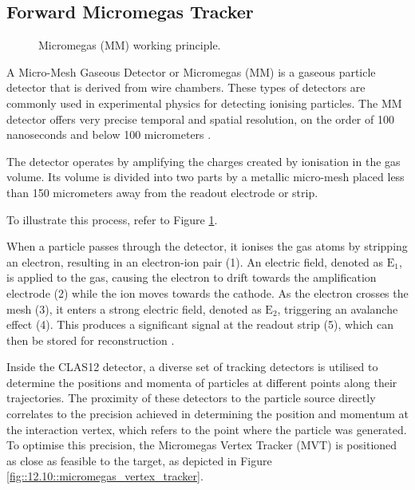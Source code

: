\subsection{Forward Micromegas Tracker}
\label{12.10::forward_micromegas_tracker}
    \begin{figure}[b!]
        \caption[Micromegas (MM) working principle]
        {Micromegas (MM) working principle.}
        \label{fig::12.10::micromegas_principle}
    \end{figure}

    A Micro-Mesh Gaseous Detector or Micromegas (MM) is a gaseous particle detector that is derived from wire chambers.
    These types of detectors are commonly used in experimental physics for detecting ionising particles.
    The MM detector offers very precise temporal and spatial resolution, on the order of 100 nanoseconds and below 100 micrometers \cite{giomataris1996}.

    The detector operates by amplifying the charges created by ionisation in the gas volume.
    Its volume is divided into two parts by a metallic micro-mesh placed less than 150 micrometers away from the readout electrode or strip.

    To illustrate this process, refer to Figure \ref{fig::12.10::micromegas_principle}.

    When a particle passes through the detector, it ionises the gas atoms by stripping an electron, resulting in an electron-ion pair (1).
    An electric field, denoted as $\text{E}_1$, is applied to the gas, causing the electron to drift towards the amplification electrode (2) while the ion moves towards the cathode.
    As the electron crosses the mesh (3), it enters a strong electric field, denoted as $\text{E}_2$, triggering an avalanche effect (4).
    This produces a significant signal at the readout strip (5), which can then be stored for reconstruction \cite{giomataris1996}.

    Inside the CLAS12 detector, a diverse set of tracking detectors is utilised to determine the positions and momenta of particles at different points along their trajectories.
    The proximity of these detectors to the particle source directly correlates to the precision achieved in determining the position and momentum at the interaction vertex, which refers to the point where the particle was generated.
    To optimise this precision, the Micromegas Vertex Tracker (MVT) is positioned as close as feasible to the target, as depicted in Figure \ref{fig::12.10::micromegas_vertex_tracker}.

